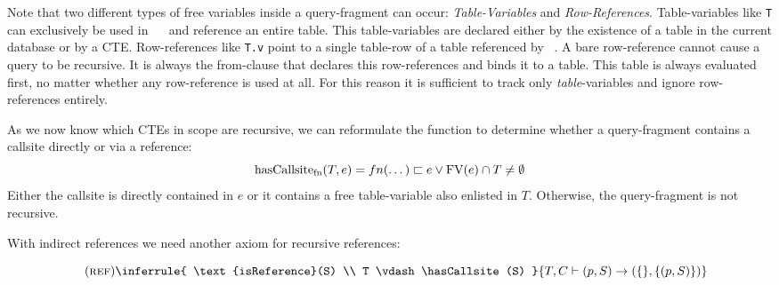 Note that two different types of free variables inside a query-fragment can occur: \textit{Table-Variables} and \textit{Row-References}. Table-variables like \texttt{T} can exclusively be used in ~\FROM~ and reference an entire table. This table-variables are declared either by the existence of a table in the current database or by a CTE. Row-references like \texttt{T.v} point to a single table-row of a table referenced by ~\FROM. A bare row-reference cannot cause a query to be recursive. It is always the from-clause that declares this row-references and binds it to a table. This table is always evaluated first, no matter whether any row-reference is used at all. For this reason it is sufficient to track only \textit{table}-variables and ignore row-references entirely.

As we now know which CTEs in scope are recursive, we can reformulate the function to determine whether a query-fragment contains a callsite directly or via a reference:
$$\operatorname{\text{hasCallsite}_{fn}}(T, e) = fn(\dots) \sqsubset e \lor \operatorname{\text{\rm FV}}(e) \cap T \neq \emptyset$$
Either the callsite is directly contained in $e$ or it contains a free table-variable also enlisted in $T$. Otherwise, the query-fragment is not recursive.

With indirect references we need another axiom for recursive references:

$$\quad(\textsc{ref})\inferrule{
   \text{isReference}(S) \\
   T \vdash \hasCallsite(S)
}{
    T, C \vdash (p, S) \rightarrow (\{\}, \{(p, S)\})
}$$



